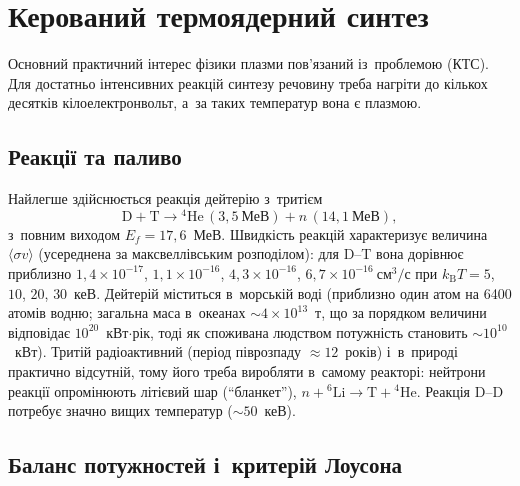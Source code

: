 \chapter{Керований термоядерний синтез}\label{sec:fusion}\hypertarget{fusion}{}

Основний практичний інтерес фізики плазми пов'язаний із~проблемою  (КТС). Для достатньо інтенсивних реакцій синтезу речовину треба
нагріти до кількох десятків кілоелектронвольт, а~за таких температур вона є плазмою.



\section{Реакції та паливо}



Найлегше здійснюється реакція дейтерію з~тритієм
\begin{equation*}
	\mathrm D+\mathrm T\to{}^4\mathrm{He}\,(3{,}5~\text{МеВ})+n\,(14{,}1~\text{МеВ}),
\end{equation*}
з~повним виходом $E_f=17{,}6$~МеВ. Швидкість реакцій характеризує величина $\langle\sigma
v\rangle$ (усереднена за максвеллівським розподілом): для D--T вона дорівнює приблизно
$1{,}4\times10^{-17}$, $1{,}1\times10^{-16}$, $4{,}3\times10^{-16}$,
$6{,}7\times10^{-16}~\mathrm{см}^3/\mathrm{с}$ при $k_{\mathrm B}T=5$, $10$, $20$,
$30$~кеВ. Дейтерій міститься в~морській воді (приблизно один атом на 6400 атомів водню;
загальна маса в~океанах $\sim4\times10^{13}$~т, що за порядком величини відповідає
$10^{20}$~кВт$\cdot$рік, тоді як споживана людством потужність становить
$\sim10^{10}$~кВт). Тритій радіоактивний (період піврозпаду $\approx12$~років) і~в~природі
практично відсутній, тому його треба виробляти в~самому реакторі: нейтрони реакції
опромінюють літієвий шар (\enquote{бланкет}), $n+{}^6\mathrm{Li}\to\mathrm
T+{}^4\mathrm{He}$. Реакція D--D потребує значно вищих температур ($\sim50$~кеВ).



\section{Баланс потужностей і~критерій Лоусона}



